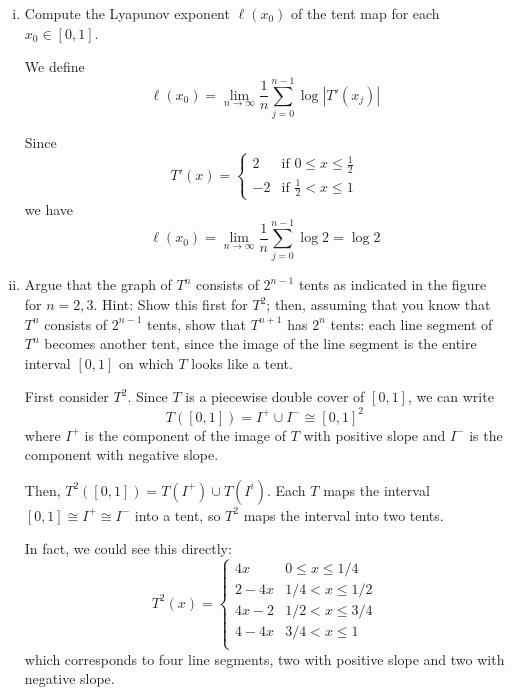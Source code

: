 \documentclass[12pt]{article}
\newcommand{\abs}[1]{\left\vert #1 \right\vert}
\begin{document}
\begin{enumerate}[(i)]
    \item Compute the Lyapunov exponent $\ell(x_0)$ of the tent map for each $x_0\in[0,1]$.

          \color{blue}
          We define
          \[ \ell(x_0) = \lim_{n \to \infty} \frac{1}{n} \sum_{j=0}^{n-1} \log \abs{T'(x_j)} \]


          Since
          \[T'(x) = \begin{cases}
                  2  & \text{if } 0\leq x\leq \frac{1}{2} \\
                  -2 & \text{if } \frac{1}{2} < x\leq 1
              \end{cases}\]
          we have
          \[\ell(x_0) = \lim_{n \to \infty} \frac{1}{n} \sum_{j=0}^{n-1} \log 2 = \boxed{\log 2}\]

          \color{black}

    \item Argue that the graph of $T^n$ consists of $2^{n-1}$ tents as indicated in the figure for $n=2,3$. Hint: Show this first for $T^2$; then, assuming that you know that $T^n$ consists of $2^{n-1}$ tents, show that $T^{n+1}$ has $2^n$ tents: each line segment of $T^n$ becomes another tent, since the image of the line segment is the entire interval $[0,1]$ on which $T$ looks like a tent.

          \color{blue}
          First consider $T^2$. Since $T$ is a piecewise double cover of $[0, 1]$, we can write
          \[T([0, 1]) = I^+ \cup I^- \cong [0,1]^2\]
          where $I^+$ is the component of the image of $T$ with positive slope and $I^-$ is the component with negative slope.

          Then, $T^2([0, 1]) = T(I^+) \cup T(I^i)$. Each $T$ maps the interval $[0, 1] \cong I^+ \cong I^-$ into a tent, so $T^2$ maps the interval into two tents.

          In fact, we could see this directly:
          \[T^2(x) = \begin{cases}
                  4x     & 0 \leq x \leq 1/4 \\
                  2 - 4x & 1/4 < x \leq 1/2  \\
                  4x - 2 & 1/2 < x \leq 3/4  \\
                  4 - 4x & 3/4 < x \leq 1    \\
              \end{cases}\]
          which corresponds to four line segments, two with positive slope and two with negative slope.


\end{enumerate}
\end{document}
